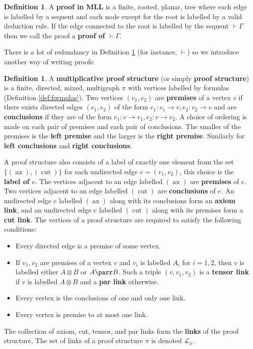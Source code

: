 \documentclass[12pt]{article}
\theoremstyle{plain}
\theoremstyle{definition}
\newtheorem{defn}[thm]{Definition} %
\newcommand{\call}[1]{\mathcal{#1}}
\newcommand{\lto}{\longrightarrow}
\newcommand{\cut}{(\operatorname{cut})}
\newcommand{\ax}{(\operatorname{ax})}
\begin{document}
	\begin{defn}\label{def:proof}
		A \textbf{proof in MLL} is a finite, rooted, planar, tree where each edge is labelled by a sequent and each node except for the root is labelled by a valid deduction rule. If the edge connected to the root is labelled by the sequent $\vdash \Gamma$ then we call the proof a \textbf{proof of $\vdash \Gamma$}.
	\end{defn}
	There is a lot of redundancy in Definition \ref{def:proof} (for instance, $\vdash$) so we introduce another way of writing proofs:
	\begin{defn}\label{def:proof_structures}
		A \textbf{multiplicative proof structure} (or simply \textbf{proof structure}) is a finite, directed, mixed, multigraph $\pi$ with vertices labelled by formulas (Definition \ref{def:formulas}). Two vertices $(v_1,v_2)$ are \textbf{premises} of a vertex $v$ if there exists directed edges $(e_1,e_2)$ of the form $e_1: v_1 \lto v, e_2: v_2 \lto v$ and are \textbf{conclusions} if they are of the form $e_1: v \lto v_1, e_2: v \lto v_2$. A choice of ordering is made on each pair of premises and each pair of conclusions. The smaller of the premises is the \textbf{left premise} and the larger is the \textbf{right premise}. Similarly for \textbf{left conclusions} and \textbf{right conclusions}.
		
		A proof structure also consists of a label of exactly one element from the set $\lbrace \ax, \cut\rbrace$ for each undirected edge $e = (v_1,v_2)$, this choice is the \textbf{label of $e$}. The vertices adjacent to an edge labelled $\ax$ are \textbf{premises} of $e$. Two vertices adjacent to an edge labelled $\cut$ are \textbf{conclusions} of $e$. An undirected edge $e$ labelled $\ax$ along with its conclusions form an \textbf{axiom link}, and an undirected edge $e$ labelled $\cut$ along with its premises form a \textbf{cut link}. The vertices of a proof structure are required to satisfy the following conditions:
		\begin{itemize}
			\item Every directed edge is a premise of some vertex.
			
			\item If $v_1,v_2$ are premises of a vertex $v$ and $v_i$ is labelled $A_i$ for $i = 1,2$, then $v$ is labelled either $A \otimes B$ or $A \parr B$. Such a triple $(v,v_1,v_2)$ is a \textbf{tensor link} if $v$ is labelled $A \otimes B$ and a \textbf{par link} otherwise.
			
			\item Every vertex is the conclusions of one and only one link.
			
			\item Every vertex is premise to at most one link.
		\end{itemize}
		The collection of axiom, cut, tensor, and par links form the \textbf{links} of the proof structure. The set of links of a proof structure $\pi$ is denoted $\call{L}_\pi$.
	\end{defn}
\end{document}
